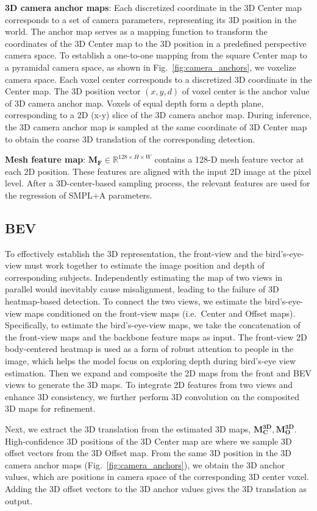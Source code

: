 \documentclass[10pt,twocolumn,letterpaper]{article}
\begin{document}
\textbf{3D camera anchor maps}:
Each discretized coordinate in the 3D Center map corresponds to a set of camera parameters, representing its 3D position in the world.
The anchor map serves as a mapping function to transform the coordinates of the 3D Center map to the 3D position in a predefined perspective camera space.
To establish a one-to-one mapping from the square Center map to a pyramidal camera space, as shown in Fig.~\ref{fig:camera_anchors}, we voxelize camera space.
Each voxel center corresponds to a discretized 3D coordinate in the Center map.
The 3D position vector $(x,y,d)$ of voxel center is the anchor value of 3D camera anchor map.
Voxels of equal depth form a depth plane, corresponding to a 2D (x-y) slice of the 3D camera anchor map.
During inference, the 3D camera anchor map is sampled at the same coordinate of 3D Center map to obtain the coarse 3D translation of the corresponding detection. 

\textbf{Mesh feature map}:
$\boldsymbol{M_F} \in \mathbb{R}^{128 \times H \times W}$ contains a 128-D mesh feature vector at each 2D position.
These features are aligned with the input 2D image at the pixel level. 
After a 3D-center-based sampling process, the relevant features are used for the regression of SMPL+A parameters.


\subsection{BEV}
To effectively establish the 3D representation, the front-view and the bird's-eye-view must work together to estimate the image position and depth of corresponding subjects.
Independently estimating the map of two views in parallel would inevitably cause misalignment, leading to the failure of 3D heatmap-based detection. 
To connect the two views, we estimate the bird's-eye-view maps conditioned on the front-view maps (i.e.~Center and Offset maps).
Specifically, to estimate the bird's-eye-view maps, we take the concatenation of the front-view maps and the backbone feature maps as input.
The front-view 2D body-centered heatmap is used as a form of robust attention to people in the image, which helps the model focus on exploring depth during bird's-eye view estimation.
Then we expand and composite the 2D maps from the front and BEV views to generate the 3D maps.
To integrate 2D features from two views and enhance 3D consistency, we further perform 3D convolution on the composited 3D maps for refinement.

Next, we extract the 3D translation from the estimated 3D maps, $\boldsymbol{M_C^{3D}},\boldsymbol{M_O^{3D}}$.
High-confidence 3D positions of the 3D Center map are where we sample 3D offset vectors from the 3D Offset map. 
From the same 3D position in the 3D camera anchor maps (Fig.~\ref{fig:camera_anchors}), we obtain the 3D anchor values, which are positions in camera space of the corresponding 3D center voxel. 
Adding the 3D offset vectors to the 3D anchor values gives the 3D translation as output. 
\end{document}
